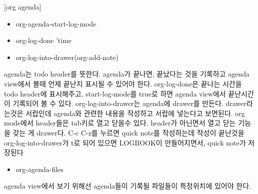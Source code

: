 \documentclass[11pt]{article}
\begin{document}
[org agenda]
\begin{itemize}
\item org-agenda-start-log-mode
\item org-log-done 'time
\item org-log-into-drawer(org-add-note)
\end{itemize}

agenda는 todo header를 뜻한다. agenda가 끝나면, 끝났다는 것을 기록하고 agenda view에서 볼때 언제 끝난지 표시될 수 있어야 한다. org-log-done은 끝나는 시간을 todo header에 표시해주고, start-log-mode를 true로 하면 agenda view에서 끝난시간이 기록되어 볼 수 있다. org-log-into-drawer는 agenda에 drawer를 만든다. drawer라는것은 서랍인데 agenda와 관련한 내용을 작성하고 서랍에 넣는다고 보면된다. org mode에서 header들은 tab키로 열고 닫을수 있다. header가 아닌면서 열고 닫는 기능을 갖는 게 drawer다. C-c C-z를 누르면 quick note를 작성하는데 작성이 끝난것을 org-log-into-drawer가 t로 되어 있으면 LOGBOOK이 만들어지면서, quick note가 저장된다

\begin{itemize}
\item org-agenda-files
\end{itemize}
agenda view에서 보기 위해선 agenda들이 기록될 파일들이 특정위치에 있어야 한다.
\end{document}
